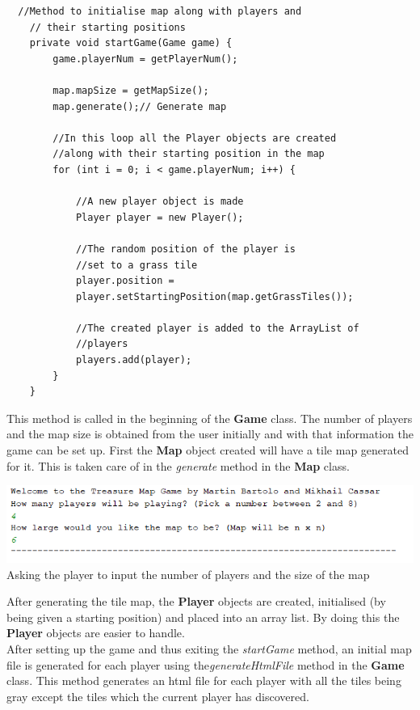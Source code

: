 \documentclass[a4paper,12pt]{extarticle}
\begin{document}
\newpage
\begin{lstlisting}
  //Method to initialise map along with players and
    // their starting positions
    private void startGame(Game game) {
        game.playerNum = getPlayerNum();

        map.mapSize = getMapSize();
        map.generate();// Generate map

        //In this loop all the Player objects are created 
        //along with their starting position in the map
        for (int i = 0; i < game.playerNum; i++) {

            //A new player object is made
            Player player = new Player();

            //The random position of the player is 
            //set to a grass tile
            player.position = 
            player.setStartingPosition(map.getGrassTiles());

            //The created player is added to the ArrayList of 
            //players
            players.add(player);
        }
    }
\end{lstlisting}
\vspace{4mm}

\noindent This method is called in the beginning of the \textbf{Game} class. The number of players and the map size is obtained from the user initially and with that information the game can be set up. First the \textbf{Map} object created will have a tile map generated for it. This is taken care of in the \textit{generate} method in the \textbf{Map} class.\\

\begin{center}
\includegraphics[scale=0.5]{BasicMap2.png}\\
Asking the player to input the number of players and the size of the map
\end{center}

\noindent After generating the tile map, the \textbf{Player} objects are created, initialised (by being given a starting position) and placed into an array list. By doing this the \textbf{Player} objects are easier to handle.\\

\noindent After setting up the game and thus exiting the \textit{startGame} method, an initial map file is generated for each player using the\textit{generateHtmlFile} method in the \textbf{Game} class. This method generates an html file for each player with all the tiles being gray except the tiles which the current player has discovered.\\
\end{document}

